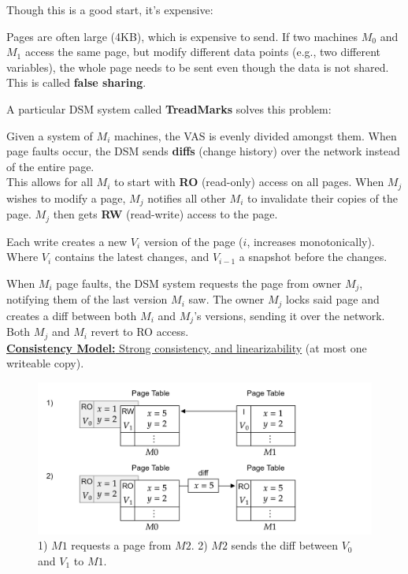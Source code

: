 \newpage 

\noindent
Though this is a good start, it's expensive:

\begin{theo}

    Pages are often large (4KB), which is expensive to send.
    If two machines $M_0$ and $M_1$ access the same page, but modify different data points (e.g., two different variables),
    the whole page needs to be sent even though the data is not shared. This is called \textbf{false sharing}.
\end{theo}

\noindent
A particular DSM system called \textbf{TreadMarks} solves this problem:
\begin{Def}

    Given a system of $M_i$ machines, the VAS is evenly divided amongst them.
    When page faults occur, the DSM sends \textbf{diffs} (change history) over the network instead of the entire page.\\

    \noindent
    This allows for all $M_i$ to start with \textbf{RO} (read-only) access on all pages. When $M_j$ wishes to 
    modify a page, $M_j$ notifies all other $M_i$ to invalidate their copies of the page. $M_j$ then gets \textbf{RW} (read-write) access to the page.


    Each write creates a new $V_i$ version of the page ($i$, increases monotonically). Where $V_i$ contains the latest changes, and $V_{i-1}$ a snapshot before the changes.
    
    When $M_i$ page faults, the DSM system requests the page from owner $M_j$, notifying them of the last version $M_i$ saw. The owner $M_j$ locks said page and creates a diff between both $M_i$ and $M_j$'s versions, sending it over the network.
    Both $M_j$ and $M_i$ revert to RO access.\\

    \noindent
    \underline{\textbf{Consistency Model:} Strong consistency, and linearizability} (at most one writeable copy).
\end{Def}

\vspace{-1em}
\begin{figure}[h]
    \centering
    \includegraphics[width=\textwidth]{Sections/shared/tread.png}
    \caption{1) $M1$ requests a page from $M2$. 2) $M2$ sends the diff between $V_0$ and $V_1$ to $M1$.}
    \label{fig:dsm}
\end{figure}

